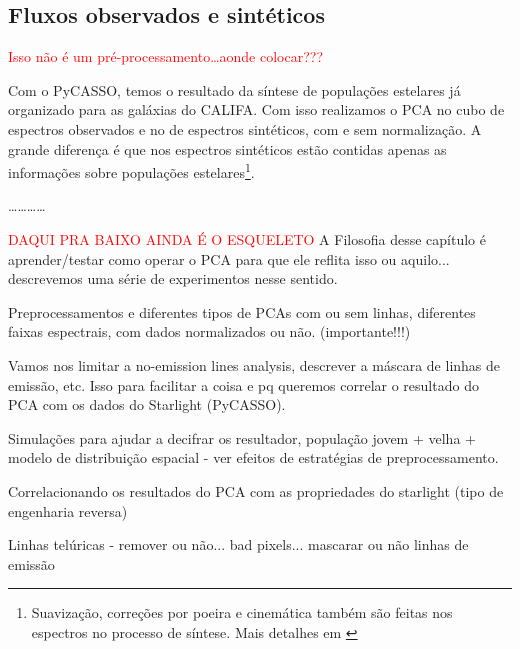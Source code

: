 \subsection{Fluxos observados e sintéticos}
\label{sec:UsoPCA:PCAlidades:flux}

\fixme \textcolor{red}{Isso não é um pré-processamento\ldots aonde colocar???}

Com o PyCASSO, temos o resultado da síntese de populações estelares já organizado para as galáxias do CALIFA. Com isso
realizamos o PCA no cubo de espectros observados e no de espectros sintéticos, com e sem normalização. A grande
diferença é que nos espectros sintéticos estão contidas apenas as informações sobre populações
estelares\footnote{Suavização, correções por poeira e cinemática também são feitas nos espectros no processo de síntese.
Mais detalhes em \citet{CidFernandes2005}}.

\ldots \dots \ldots \ldots

\textcolor{red}{DAQUI PRA BAIXO AINDA É O ESQUELETO}
\ojo A Filosofia desse capítulo é aprender/testar como operar o PCA para que ele
reflita isso ou aquilo... descrevemos uma série de experimentos nesse sentido.

Preprocessamentos e diferentes tipos de PCAs com ou sem linhas, diferentes
faixas espectrais, com dados normalizados ou não. (importante!!!)

Vamos nos limitar a no-emission lines analysis, descrever a máscara de linhas de
emissão, etc. Isso para facilitar a coisa e pq queremos correlar o resultado do
PCA com os dados do Starlight (PyCASSO).

Simulações para ajudar a decifrar os resultador, população jovem + velha +
modelo de distribuição espacial - ver efeitos de estratégias de
preprocessamento.

Correlacionando os resultados do PCA com as propriedades do starlight (tipo de
engenharia reversa)

Linhas telúricas - remover ou não... bad pixels... mascarar ou não linhas de
emissão